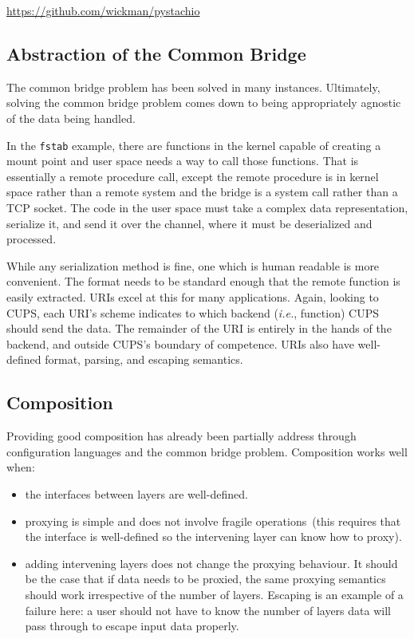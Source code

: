 \documentclass[letterpaper,twocolumn,10pt]{article}
\begin{document}
\noindent \url{https://github.com/wickman/pystachio}

\subsection{Abstraction of the Common Bridge}
The common bridge problem has been solved in many instances. Ultimately, solving the common bridge problem comes down to being appropriately agnostic of the data being handled.

In the \texttt{fstab} example, there are functions in the kernel capable of creating a mount point and user space needs a way to call those functions. That is essentially a remote procedure call, except the remote procedure is in kernel space rather than a remote system and the bridge is a system call rather than a TCP socket. The code in the user space must take a complex data representation, serialize it, and send it over the channel, where it must be deserialized and processed.

While any serialization method is fine, one which is human readable is more convenient. The format needs to be standard enough that the remote function is easily extracted. URIs excel at this for many applications. Again, looking to CUPS, each URI's scheme indicates to which backend (\emph{i.e.}, function) CUPS should send the data. The remainder of the URI is entirely in the hands of the backend, and outside CUPS's boundary of competence. URIs also have well-defined format, parsing, and escaping semantics.

\subsection{Composition}
Providing good composition has already been partially address through configuration languages and the common bridge problem. Composition works well when:

\begin{itemize}
\item the interfaces between layers are well-defined.
\item proxying is simple and does not involve fragile operations~(this requires that the interface is well-defined so the intervening layer can know how to proxy).
\item adding intervening layers does not change the proxying behaviour. It should be the case that if data needs to be proxied, the same proxying semantics should work irrespective of the number of layers. Escaping is an example of a failure here: a user should not have to know the number of layers data will pass through to escape input data properly.
\end{itemize}
\end{document}
